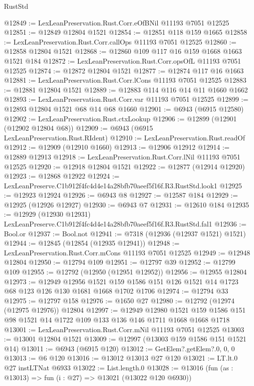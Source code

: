 \begin{lexlean}{RustStd}
\begin{coremodule}
@12849 := LexLeanPreservation.Rust.Corr.eOfBNil @11193 @7051 @12525
@12851 := @12849 @12804 @1521
@12854 := @12851 @118 @159 @1665
@12858 := LexLeanPreservation.Rust.Corr.callOps @11193 @7051 @12525
@12860 := @12858 @12804 @1521
@12868 := @12860 @109 @117 @16 @159 @1668 @1663 @1521 @184
@12872 := LexLeanPreservation.Rust.Corr.opsOfL @11193 @7051 @12525
@12874 := @12872 @12804 @1521
@12877 := @12874 @117 @16 @1663
@12881 := LexLeanPreservation.Rust.Corr.lCons @11193 @7051 @12525
@12883 := @12881 @12804 @1521
@12889 := @12883 @114 @116 @14 @11 @1660 @1662
@12893 := LexLeanPreservation.Rust.Corr.var @11193 @7051 @12525
@12899 := @12893 @12804 @1521 @68 @14 @68 @1660
@12901 := @6943 (@6915 @12580)
@12902 := LexLeanPreservation.Rust.ctxLookup
@12906 := @12899 (@12901 (@12902 @12804 @68))
@12909 := @6943 (@6915 LexLeanPreservation.Rust.RIdent)
@12910 := LexLeanPreservation.Rust.readOf
@12912 := @12909 (@12910 @1660)
@12913 := @12906 @12912
@12914 := @12889 @12913
@12918 := LexLeanPreservation.Rust.Corr.lNil @11193 @7051 @12525
@12920 := @12918 @12804 @1521
@12922 := @12877 (@12914 @12920)
@12923 := @12868 @12922
@12924 := LexLeanPreserve.C1b912f4fc4d4e14a28bfb70aeef5f16f.R3.RustStd.look1
@12925 := @12923 @12924
@12926 := @6943 @8
@12927 := @12587 @184
@12929 := @12925 (@12926 @12927)
@12930 := @6943 @7
@12931 := @12610 @184
@12935 := @12929 (@12930 @12931) LexLeanPreserve.C1b912f4fc4d4e14a28bfb70aeef5f16f.R3.RustStd.fal1
@12936 := Bool.or
@12937 := Bool.not
@12941 := @7318 (@12936 (@12937 @1521) @1521)
@12944 := @12845 (@12854 (@12935 @12941))
@12948 := LexLeanPreservation.Rust.Corr.mCons @11193 @7051 @12525
@12949 := @12948 @12804
@12950 := @12794 @109
@12951 := @12797 @39
@12952 := @12799 @109
@12955 := @12792 (@12950 (@12951 @12952))
@12956 := @12955 @12804
@12973 := @12949
    @12956
    @1521
    @159
    @1586
    @151
    @126
    @1521
    @14
    @1723
    @68
    @123
    @126
    @130
    @1681
    @1668
    @1702
    @1706
@12974 := @12794 @33
@12975 := @12797 @158
@12976 := @1650 @27
@12980 := @12792 (@12974 (@12975 @12976)) @12804
@12997 := @12949
    @12980
    @1521
    @159
    @1586
    @151
    @98
    @1521
    @14
    @1722
    @109
    @133
    @136
    @146
    @1711
    @1668
    @1668
    @1718
@13001 := LexLeanPreservation.Rust.Corr.mNil @11193 @7051 @12525
@13003 := @13001 @12804 @1521
@13009 := @12997 (@13003 @159 @1586 @151 @1521 @14)
@13011 := @6943 (@6915 @120)
@13012 := GetElem?.getElem?.{0, 0, 0}
@13013 := @6 @120
@13016 := @13012 @13013 @27 @120
@13021 := LT.lt.{0} @27 instLTNat @6933
@13022 := List.length.{0}
@13028 := @13016 (fun (as : @13013) => fun (i : @27) => @13021 (@13022 @120 @6930))

\end{coremodule}
\end{lexlean}
